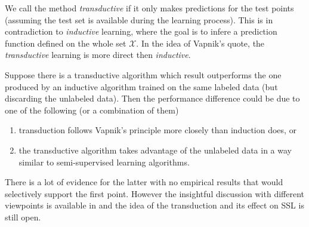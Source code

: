 We call the method \textit{transductive} if it only makes predictions for the test points (assuming the test set is available during the learning process). This is 
in contradiction to \textit{inductive} learning, where the goal is to infere a prediction function defined on the whole set $\mathcal{X}$. In the idea of Vapnik's
quote, the \textit{transductive} learning is more direct then \textit{inductive}.

Suppose there is a transductive algorithm which result outperforms the one produced by an inductive algorithm trained on the same labeled data (but discarding the 
unlabeled data). Then the performance difference could be due to one of the following (or a combination of them)
\begin{enumerate}
    \item transduction follows Vapnik's principle more closely than induction does, or
    \item the transductive algorithm takes advantage of the unlabeled data in a way similar to semi-supervised learning algorithms. 
\end{enumerate}
There is a lot of evidence for the latter with no empirical results that would selectively support the first point\cite[p. 7]{ssl-book-2006}. However the 
insightful discussion with different viewpoints is available in \cite[chap. 25]{ssl-book-2006} and the idea of the transduction and its effect on SSL is still open.

